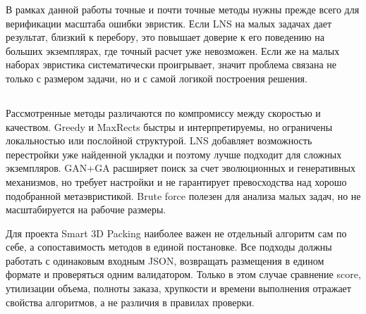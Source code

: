 В рамках данной работы точные и почти точные методы нужны прежде всего для верификации масштаба ошибки эвристик. Если LNS на малых задачах дает результат, близкий к перебору, это повышает доверие к его поведению на больших экземплярах, где точный расчет уже невозможен. Если же на малых наборах эвристика систематически проигрывает, значит проблема связана не только с размером задачи, но и с самой логикой построения решения.

\subsection{}

Рассмотренные методы различаются по компромиссу между скоростью и качеством. Greedy и MaxRects быстры и интерпретируемы, но ограничены локальностью или послойной структурой. LNS добавляет возможность перестройки уже найденной укладки и поэтому лучше подходит для сложных экземпляров. GAN+GA расширяет поиск за счет эволюционных и генеративных механизмов, но требует настройки и не гарантирует превосходства над хорошо подобранной метаэвристикой. Brute force полезен для анализа малых задач, но не масштабируется на рабочие размеры.

Для проекта Smart 3D Packing наиболее важен не отдельный алгоритм сам по себе, а сопоставимость методов в единой постановке. Все подходы должны работать с одинаковым входным JSON, возвращать размещения в едином формате и проверяться одним валидатором. Только в этом случае сравнение score, утилизации объема, полноты заказа, хрупкости и времени выполнения отражает свойства алгоритмов, а не различия в правилах проверки.
